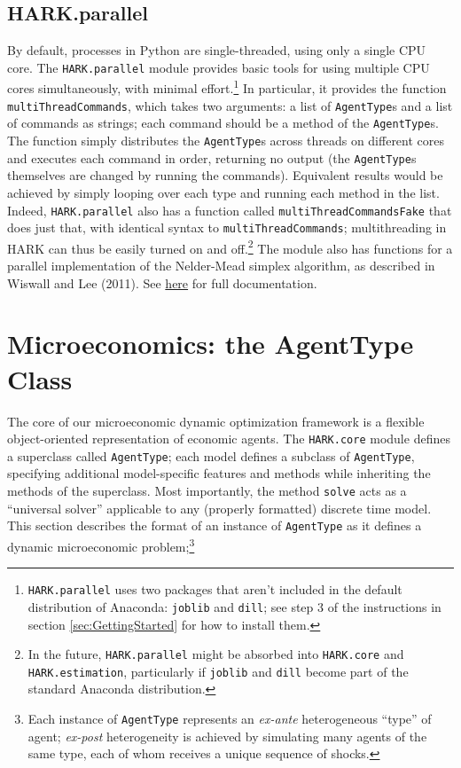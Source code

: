 \documentclass[12pt,titlepage,letterpaper]{econtex}
\begin{document}
{\subsection{HARK.parallel}\label{sec:HARKparallel}

By default, processes in Python are single-threaded, using only a single CPU core.  The \texttt{HARK.parallel} module provides basic tools for using multiple CPU cores simultaneously, with minimal effort.\footnote{\texttt{HARK.parallel} uses two packages that aren't included in the default distribution of Anaconda: \texttt{joblib} and \texttt{dill}; see step 3 of the instructions in section \ref{sec:GettingStarted} for how to install them.}  In particular, it provides the function \texttt{multiThreadCommands}, which takes two arguments: a list of \texttt{AgentType}s and a list of commands as strings; each command should be a method of the \texttt{AgentType}s.  The function simply distributes the \texttt{AgentType}s across threads on different cores and executes each command in order, returning no output (the \texttt{AgentType}s themselves are changed by running the commands).  Equivalent results would be achieved by simply looping over each type and running each method in the list.  Indeed, \texttt{HARK.parallel} also has a function called \texttt{multiThreadCommandsFake} that does just that, with identical syntax to \texttt{multiThreadCommands}; multithreading in HARK can thus be easily turned on and off.\footnote{In the future, \texttt{HARK.parallel} might be absorbed into \texttt{HARK.core} and \texttt{HARK.estimation}, particularly if \texttt{joblib} and \texttt{dill} become part of the standard Anaconda distribution.}  The module also has functions for a parallel implementation of the Nelder-Mead simplex algorithm, as described in Wiswall and Lee (2011). See \href{https://hark.readthedocs.io/en/latest/generated/HARK.parallel.html}{here} for full documentation.

\section{Microeconomics: the AgentType Class}\label{sec:Microeconomics}

The core of our microeconomic dynamic optimization framework is a flexible object-oriented representation of economic agents.  The \texttt{HARK.core} module defines a superclass called \texttt{AgentType}; each model defines a subclass of \texttt{AgentType}, specifying additional model-specific features and methods while inheriting the methods of the superclass.  Most importantly, the method \texttt{solve} acts as a ``universal solver'' applicable to any (properly formatted) discrete time model.  This section describes the format of an instance of \texttt{AgentType} as it defines a dynamic microeconomic problem;\footnote{Each instance of \texttt{AgentType} represents an \textit{ex-ante} heterogeneous ``type'' of agent; \textit{ex-post} heterogeneity is achieved by simulating many agents of the same type, each of whom receives a unique sequence of shocks.}

}
\end{document}
